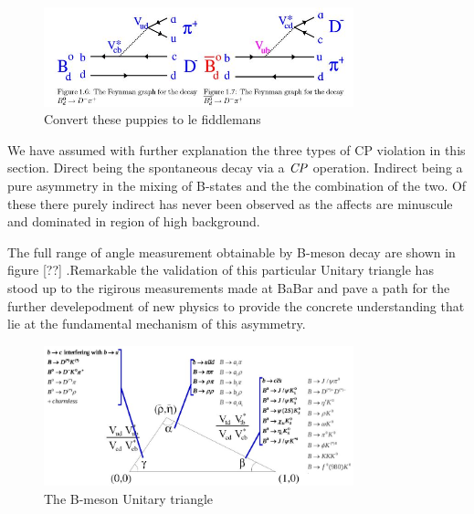  \begin{figure}[h]
\centering
\includegraphics[width=0.8\textwidth]{figs/gam.JPG}
\caption{Convert these puppies to le fiddlemans}
\label{pBGD}
\end{figure}


We have assumed with further explanation the three types of CP violation in this section. Direct being the spontaneous decay via a $\it{CP}$ operation. Indirect being a pure asymmetry in the mixing of B-states and the the combination of the two. Of these there purely indirect has never been observed as the affects are minuscule and dominated in region of high background.


The full range of angle measurement obtainable by B-meson decay are shown in figure [??] .Remarkable the validation of this particular Unitary triangle has stood up to the rigirous measurements made at BaBar and pave a path for the further develepodment of new physics to provide the concrete understanding that lie at the fundamental mechanism of this asymmetry.
 \begin{figure}[h]
\centering
\includegraphics[width=0.8\textwidth]{figs/trig.JPG}
\caption{The B-meson Unitary triangle}
\label{BBD}
\end{figure}



%
